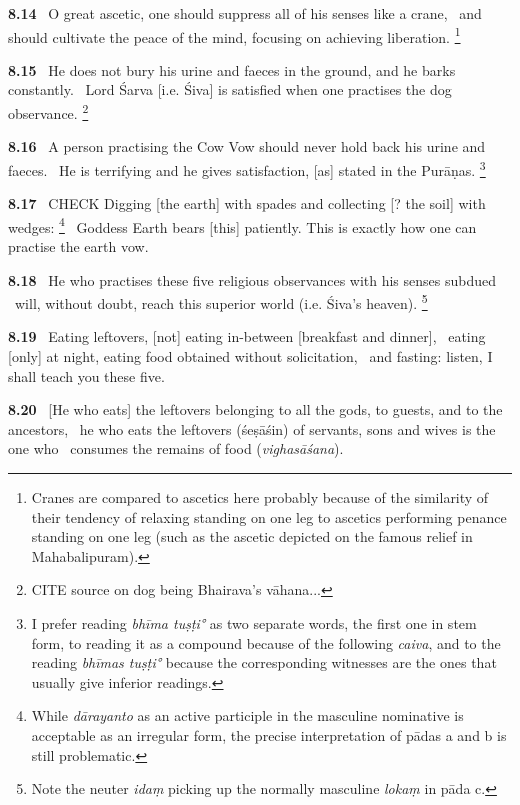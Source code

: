 \documentclass{article}
\newcommand{\skt}[1]{\textit{#1}}
\begin{document}
\textbf{8.14}%
\ O great ascetic, one should suppress all of his senses like a crane,%
\ and should cultivate the peace of the mind, focusing on achieving liberation.%
\footnote{Cranes are compared to ascetics here probably because of the similarity of                their tendency of relaxing standing on one leg to ascetics performing penance                 standing on one leg (such as the ascetic depicted on the famous relief in Mahabalipuram).  }%


\textbf{8.15}%
\ He does not bury his urine and faeces in the ground, and he barks constantly.%
\ Lord Śarva [i.e. Śiva] is satisfied when one practises the dog observance.%
\footnote{CITE source on dog being Bhairava's vāhana... }%


\textbf{8.16}%
\ A person practising the Cow Vow should never hold back his urine and faeces.%
\ He is terrifying and he gives satisfaction, [as] stated in the Purāṇas.%
\footnote{I prefer reading \skt{bhīma tuṣṭi°} as two separate words, the first                one in stem form, to reading it as a compound because                of the following \skt{caiva}, and to the reading \skt{bhīmas tuṣṭi°}                 because the corresponding witnesses are the ones that usually give inferior readings. }%


\textbf{8.17}%
\ CHECK Digging [the earth] with spades and collecting [? the soil] with wedges:%
\footnote{While \skt{dārayanto} as an active participle in the masculine nominative is acceptable                as an irregular form, the precise interpretation of pādas a and b is still problematic. }%
\ Goddess Earth bears [this] patiently. This is exactly how one can practise the earth vow.%


\textbf{8.18}%
\ He who practises these five religious observances with his senses subdued%
\ will, without doubt, reach this superior world (i.e. Śiva's heaven).%
\footnote{Note the neuter \skt{idaṃ} picking up the normally masculine \skt{lokaṃ} in pāda c. }%


\textbf{8.19}%
\ Eating leftovers, [not] eating in-between [breakfast and dinner],%
\                         eating [only] at night, eating food obtained without solicitation,%
\ and fasting: listen, I shall teach you these five.%


\textbf{8.20}%
\ [He who eats] the leftovers belonging to all the gods, to guests, and to the ancestors,%
\ he who eats the leftovers (śeṣāśin) of servants, sons and wives is the one who%
\                         consumes the remains of food (\skt{vighasāśana}).%
\end{document}
